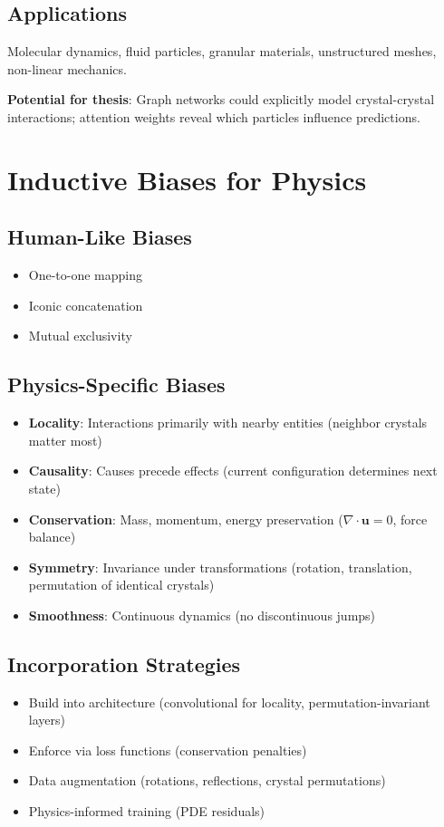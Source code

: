 \subsection{Applications}
Molecular dynamics, fluid particles, granular materials, unstructured meshes, non-linear mechanics.

\textbf{Potential for thesis}: Graph networks could explicitly model crystal-crystal interactions; attention weights reveal which particles influence predictions.

\section{Inductive Biases for Physics}

\subsection{Human-Like Biases}
\begin{itemize}
    \item One-to-one mapping
    \item Iconic concatenation
    \item Mutual exclusivity
\end{itemize}

\subsection{Physics-Specific Biases}
\begin{itemize}
    \item \textbf{Locality}: Interactions primarily with nearby entities (neighbor crystals matter most)
    \item \textbf{Causality}: Causes precede effects (current configuration determines next state)
    \item \textbf{Conservation}: Mass, momentum, energy preservation ($\nabla \cdot \mathbf{u} = 0$, force balance)
    \item \textbf{Symmetry}: Invariance under transformations (rotation, translation, permutation of identical crystals)
    \item \textbf{Smoothness}: Continuous dynamics (no discontinuous jumps)
\end{itemize}

\subsection{Incorporation Strategies}
\begin{itemize}
    \item Build into architecture (convolutional for locality, permutation-invariant layers)
    \item Enforce via loss functions (conservation penalties)
    \item Data augmentation (rotations, reflections, crystal permutations)
    \item Physics-informed training (PDE residuals)
\end{itemize}

